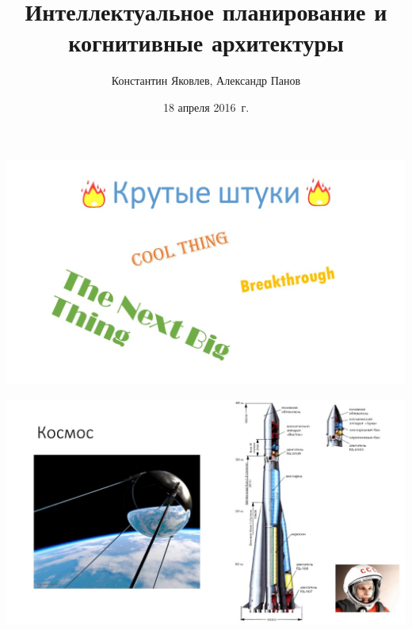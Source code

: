 \documentclass[default]{beamer}
\begin{document}
	
	\title[ИПиКА]{Интеллектуальное планирование и когнитивные архитектуры}
	\author[Панов,Яковлев]{Константин Яковлев, Александр Панов}
	\date{18 апреля 2016~г.} 
	
	\begin{frame}
		\titlepage
	\end{frame}

	\begin{frame}
		
		\includegraphics[width=\textwidth]{advert/slide2.jpg}
	\end{frame}
	
	\begin{frame}
		\includegraphics[width=\textwidth]{advert/slide3.jpg}		
	\end{frame}
\end{document}
